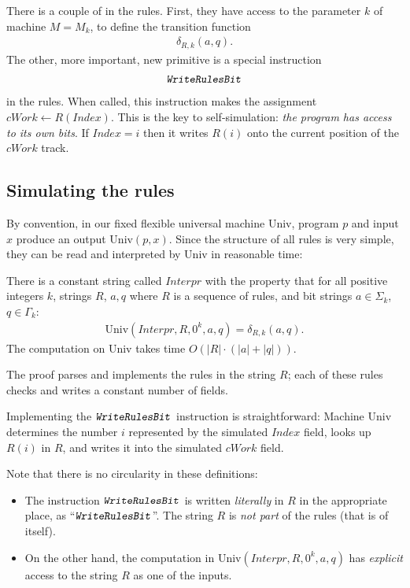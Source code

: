 \documentclass[12pt]{memoir}
\newcommand{\fld}[1]{\ensuremath{\textit{#1}}}
\newcommand{\rul}[1]{\ensuremath{\texttt{\slshape #1\/}}}
\newcommand{\Index}{\fld{Index}}
\newcommand{\cWork}{\fld{cWork}}
\newcommand{\Interpr}{\mathit{Interpr}}
\newcommand{\Un}{\mathrm{Univ}}
\newcommand{\WriteRulesBit}{\rul{WriteRulesBit}}
\begin{document}
There is a couple of  in the rules.
First, they have access to the parameter \( k \) of machine \( M=M_{k} \), 
to define the transition function
 \begin{align*}
            \delta_{R,k}(a,q).
 \end{align*}
The other, more important, new primitive is a special instruction
 \begin{align*}
   \WriteRulesBit
 \end{align*}
in the rules.
When called, this instruction makes the assignment \( \cWork\gets R(\Index) \).
This is the key to self-simulation: \emph{the program has
access to its own bits}.
If \( \Index=i \) then it writes \( R(i) \) onto the current position of the \( \cWork \) track.


\subsection{Simulating the rules}

By convention, in our fixed flexible universal machine \( \Un \),
program \( p \) and input \( x \) produce an output \( \Un(p,x) \).
Since the structure of all rules is very simple, they can be read and
interpreted by \( \Un \) in reasonable time:

\begin{theorem}
There is a constant string called \( \Interpr \) with the property that for
all positive integers \( k \), strings \( R \), \( a,q \) where \( R \) is a
sequence of rules, and bit strings \( a\in\Sigma_{k} \), \( q\in \Gamma_{k} \):
 \begin{align*}
  \Un(\Interpr,R,0^{k},a,q)=\delta_{R,k}(a,q).
 \end{align*}
The computation on \( \Un \) takes time \( O(|R|\cdot (|a|+|q|)) \).
\end{theorem}

The proof parses and implements the rules in the string \( R \); each of these rules
checks and writes a constant number of fields.

Implementing the \( \WriteRulesBit \) instruction is straightforward:
Machine \( \Un \) determines the number \( i \)
represented by the simulated \( \Index \) field, 
looks up \( R(i) \) in \( R \), and writes it into the simulated \( \cWork \) field.

Note that there is no circularity in these definitions:
  \begin{itemize}
  \item 
The instruction \( \WriteRulesBit \) is written \emph{literally}
in \( R \) in the appropriate place, as ``\(\WriteRulesBit \)''.
The string \( R \) is \emph{not part} of the rules (that is of itself).  
  \item On the other hand, the computation in
\( \Un(\Interpr,R,0^{k},a, q) \) 
has \emph{explicit} access to the string \( R \) as one of the inputs.
  \end{itemize}
\end{document}
